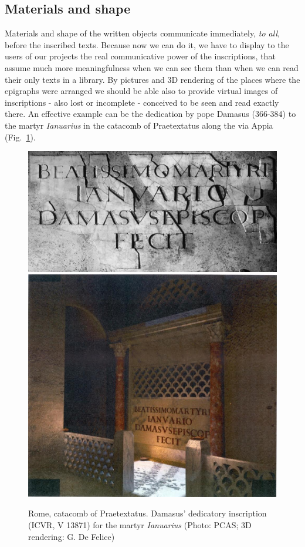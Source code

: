 \documentclass[amsthm,ebook]{saparticle}
\begin{document}
\subsection{Materials and shape }


\noindent Materials and shape of the written objects communicate immediately, \emph{to all}, before the inscribed texts. Because now we
can do it, we have to display to the users of our projects the real communicative power of the inscriptions, that
assume much more meaningfulness when we can see them than when we can read their only texts in a library. By pictures
and 3D rendering of the places where the epigraphs were arranged we should be able also to provide virtual images of
inscriptions {}- also lost or incomplete - conceived to be seen and read exactly there. An effective example can be
the dedication by pope Damasus (366-384) to the martyr \emph{Ianuarius} in the catacomb of Praetextatus along the via Appia (Fig.~\ref{fig:6}). 

\begin{figure}[!bp]
\centering
 \includegraphics[scale=0.4]{FelleVisualFeaturesofinscriptionsEAGLE2016FullPaper-img008.jpg}
 \includegraphics[scale=0.3]{FelleVisualFeaturesofinscriptionsEAGLE2016FullPaper-img009.jpg}
\caption{Rome, catacomb of Praetextatus. Damasus’ dedicatory inscription (ICVR, V 13871) for the martyr \emph{Ianuarius} (Photo:
PCAS; 3D rendering: G. De Felice)}
\label{fig:6}
\end{figure}
\end{document}
